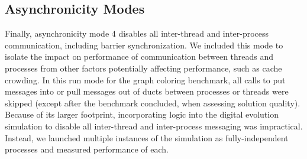 \subsection{Asynchronicity Modes} \label{sec:asynchronicity_modes}

Finally, asynchronicity mode 4 disables all inter-thread and inter-process communication, including barrier synchronization.
We included this mode to isolate the impact on performance of communication between threads and processes from other factors potentially affecting performance, such as cache crowding.
In this run mode for the graph coloring benchmark, all calls to put messages into or pull messages out of ducts between processes or threads were skipped (except after the benchmark concluded, when assessing solution quality).
Because of its larger footprint, incorporating logic into the digital evolution simulation to disable all inter-thread and inter-process messaging was impractical.
Instead, we launched multiple instances of the simulation as fully-independent processes and measured performance of each.
